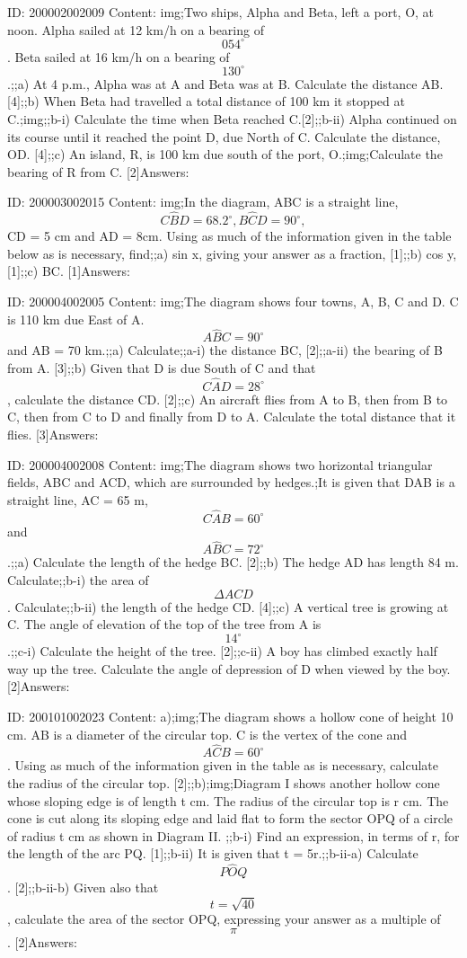 \documentclass{article}
\begin{document}
ID: 200002002009
Content:
img;Two ships, Alpha and Beta, left a port, O, at noon. Alpha sailed at 12 km/h on a bearing of $$054^{\circ}$$. Beta sailed at 16 km/h on a bearing of $$130^{\circ}$$.;;a) At 4 p.m., Alpha was at A and Beta was at B. Calculate the distance AB. [4];;b) When Beta had travelled a total distance of 100 km it stopped at C.;img;;b-i) Calculate the time when Beta reached C.[2];;b-ii) Alpha continued on its course until it reached the point D, due North of C. Calculate the distance, OD. [4];;c) An island, R, is 100 km due south of the port, O.;img;Calculate the bearing of R from C. [2]Answers:

ID: 200003002015
Content:
img;In the diagram, ABC is a straight line, $$C \hat BD = 68.2^{\circ}, B \hat CD = 90^{\circ},$$ CD = 5 cm and AD = 8cm. Using as much of the information given in the table below as is necessary, find;;a) sin x, giving your answer as a fraction, [1];;b) cos y, [1];;c) BC. [1]Answers:

ID: 200004002005
Content:
img;The diagram shows four towns, A, B, C and D. C is 110 km due East of A. $$A \hat BC = 90^{\circ}$$ and AB = 70 km.;;a) Calculate;;a-i) the distance BC, [2];;a-ii) the bearing of B from A. [3];;b) Given that D is due South of C and that $$C \hat AD = 28^{\circ}$$, calculate the distance CD. [2];;c) An aircraft flies from A to B, then from B to C, then from C to D and finally from D to A. Calculate the total distance that it flies. [3]Answers:

ID: 200004002008
Content:
img;The diagram shows two horizontal triangular fields, ABC and ACD, which are surrounded by hedges.;It is given that DAB is a straight line, AC = 65 m, $$C \hat AB = 60^{\circ}$$ and $$A \hat BC = 72^{\circ}$$.;;a) Calculate the length of the hedge BC. [2];;b) The hedge AD has length 84 m. Calculate;;b-i) the area of $$\Delta ACD$$. Calculate;;b-ii) the length of the hedge CD. [4];;c) A vertical tree is growing at C. The angle of elevation of the top of the tree from A is $$14^{\circ}$$.;;c-i) Calculate the height of the tree. [2];;c-ii) A boy has climbed exactly half way up the tree. Calculate the angle of depression of D when viewed by the boy. [2]Answers:

ID: 200101002023
Content:
a);img;The diagram shows a hollow cone of height 10 cm. AB is a diameter of the circular top. C is the vertex of the cone and $$A \hat CB=60^{\circ}$$. Using as much of the information given in the table as is necessary, calculate the radius of the circular top. [2];;b);img;Diagram I shows another hollow cone whose sloping edge is of length t cm. The radius of the circular top is r cm. The cone is cut along its sloping edge and laid flat to form the sector OPQ of a circle of radius t cm as shown in Diagram II. ;;b-i) Find an expression, in terms of r, for the length of the arc PQ. [1];;b-ii) It is given that  t = 5r.;;b-ii-a) Calculate $$P \hat OQ$$. [2];;b-ii-b) Given also that $$t=\sqrt{40}$$, calculate the area of the sector OPQ, expressing your answer as a multiple of $$\pi$$. [2]Answers:
\end{document}
